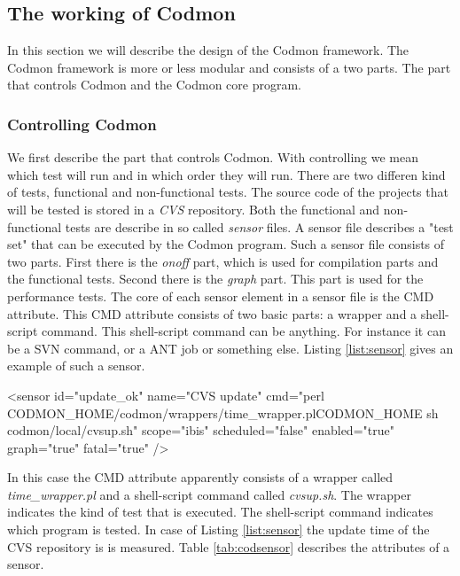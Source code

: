 \documentclass{article}
\begin{document}
\subsection{The working of Codmon}
\label{subsec:CodmonDesign}
In this section we will describe the design of the Codmon framework. The Codmon framework is more or less modular and consists of a two parts. The part that controls Codmon and the Codmon core program.\\

\subsubsection{Controlling Codmon}
\label{control}
\noindent We first describe the part that controls Codmon. With controlling we mean which test will run and in which order they will run. There are two differen kind of tests, functional and non-functional 
tests. The source code of the projects that will be tested is stored in a \emph{CVS} repository. Both the functional and non-functional tests are describe in so called \emph{sensor} files. A sensor file 
describes a "test set" that can be executed by the Codmon program. Such a sensor file consists of two parts. First there is the \emph{onoff} part, which is used for compilation parts and the functional 
tests.  Second there is the \emph{graph} part. This part is used for the performance tests. The core of each sensor element in a sensor file is the CMD attribute. This CMD attribute consists of two basic 
parts: a wrapper and a shell-script command. This shell-script command can be anything. For instance it can be a SVN command, or a ANT job or something else. Listing \ref{list:sensor} gives an example of 
such a sensor.\\


\begin{code}[frame=shadowbox, language=XML,showstringspaces=false]
 <sensor id="update_ok" 
    name="CVS update" 
    cmd="perl CODMON_HOME/codmon/wrappers/time_wrapper.plCODMON_HOME sh codmon/local/cvsup.sh" 
    scope="ibis" 
    scheduled="false"
    enabled="true"
    graph="true" 
    fatal="true" />
\end{code}

\noindent In this case the CMD attribute apparently consists of a wrapper called \emph{time\_wrapper.pl} and a shell-script command called \emph{cvsup.sh}. The wrapper indicates the kind of test
that is executed. The shell-script command indicates which program is tested. In case of Listing \ref{list:sensor} the update time of the CVS repository is is measured. Table \ref{tab:codsensor} describes
the attributes of a sensor\cite{Codmon}.\\
\end{document}
